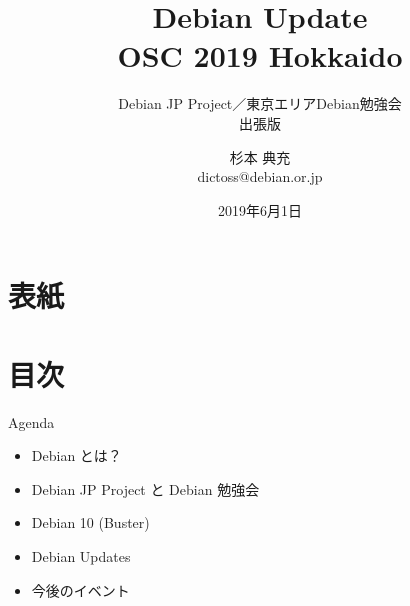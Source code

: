 \title{Debian Update\\OSC 2019 Hokkaido}
\subtitle{Debian JP Project／東京エリアDebian勉強会\\出張版}
\author{杉本 典充\\ dictoss@debian.or.jp}
\date{2019年6月1日}



\section{表紙}

\begin{frame}
\titlepage{}
\end{frame}

\section{目次}

\begin{frame}{Agenda}
  \begin{itemize}
  \item Debian とは？
  \item Debian JP Project と Debian 勉強会
  \item Debian 10 (Buster)
  \item Debian Updates
  \item 今後のイベント
  \end{itemize}
\end{frame}


